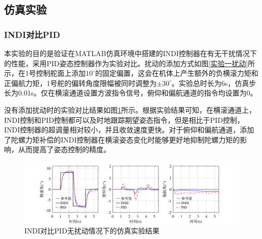 \subsection{仿真实验}

\subsubsection{INDI对比PID}

本实验的目的是验证在MATLAB仿真环境中搭建的INDI控制器在有无干扰情况下的性能，采用PID姿态控制器作为实验对比。扰动的添加方式如图\ref{实验一扰动}所示，在1号控制舵面上添加$10^{\circ}$的固定偏置，这会在机体上产生额外的负横滚力矩和正偏航力矩，1号舵的偏转角度限幅被同时调整为$\pm30^{\circ}$。实验总时长为6s，仿真步长为0.01s。仅在横滚通道设置方波指令信号，俯仰和偏航通道的指令均设置为0。

没有添加扰动时的实验对比结果如图\ref{INDI对比PID仿真无扰动}所示。根据实验结果可知，在横滚通道上，INDI控制和PID控制都可以及时地跟踪期望姿态指令，但是相比于PID控制，INDI控制器的超调量相对较小，并且收敛速度更快。对于俯仰和偏航通道，添加了陀螺力矩补偿的INDI控制器在横滚姿态变化时能够更好地抑制陀螺力矩的影响，从而提高了姿态控制的精度。
\begin{figure}[htbp]
	\centering
	\begin{minipage}[c]{1\textwidth}
        \centering
        \includegraphics[scale=1]{Fig/INDI对比PID无扰动仿真实验结果.pdf}
        \caption{\label{INDI对比PID仿真无扰动}INDI对比PID无扰动情况下的仿真实验结果}
        \end{minipage}
\end{figure}

